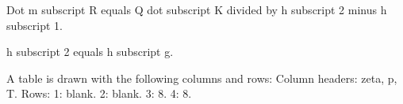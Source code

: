 Dot m subscript R equals Q dot subscript K divided by h subscript 2 minus h subscript 1.  

h subscript 2 equals h subscript g.  

A table is drawn with the following columns and rows:  
Column headers: zeta, p, T.  
Rows:  
1: blank.  
2: blank.  
3: 8.  
4: 8.